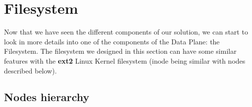 \documentclass[../main.tex]{subfiles}
\begin{document}
\section{Filesystem}
\label{section:lauxus:filesystem}
\par Now that we have seen the different components of our solution, we can start to look in more details into one of the components of the Data Plane: the Filesystem. The filesystem we designed in this section can have some similar features with the \textbf{ext2} Linux Kernel filesystem (inode being similar with nodes described below).

\subsection{Nodes hierarchy}
\label{section:lauxus:filesystem_nodes}
\end{document}
